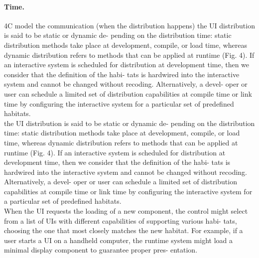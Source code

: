 \paragraph{Time.}
4C model the communication (when the distribution happens)
\cite{demeure20084c} the UI distribution is said to be static or dynamic de-
pending on the distribution time: static distribution methods take place at
development, compile, or load time, whereas dynamic distribution refers to
methods that can be applied at runtime (Fig. 4). If an interactive system is
scheduled for distribution at development time, then we consider that the
definition of the habi- tats is hardwired into the interactive system and cannot
be changed without recoding. Alternatively, a devel- oper or user can schedule a
limited set of distribution capabilities at compile time or link time by
configuring the interactive system for a particular set of predefined
habitats.\\
\cite{demeure20084c} the UI distribution is said to be static or dynamic de-
pending on the distribution time: static distribution methods take place at
development, compile, or load time, whereas dynamic distribution refers to
methods that can be applied at runtime (Fig. 4). If an interactive system is scheduled for distribution at development time, then we consider that the definition of the habi- tats is hardwired into the interactive system and cannot be changed without recoding. Alternatively, a devel- oper or user can schedule a limited set of distribution capabilities at compile time or link time by configuring the interactive system for a particular set of predefined habitats. \\
\cite{demeure20084c}When the UI requests the loading of a new component, the
control might select from a list of UIs with different capabilities of
supporting various habi- tats, choosing the one that most closely matches the
new habitat. For example, if a user starts a UI on a handheld computer, the runtime system might load a minimal display component to guarantee proper pres- entation. \\

